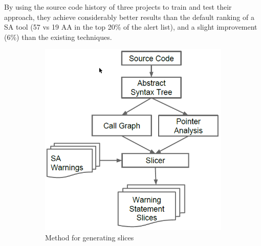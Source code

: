  By using the source code history of three projects to train and test their approach, they achieve considerably better results than the default ranking of a SA tool (57 vs 19 AA in the top 20\% of the alert list), and a slight improvement (6\%) than the existing techniques.

 \begin{figure}[H]
     \begin{subfigure}{.5\textwidth}
         \centering
         \includegraphics[scale=0.3]{./src/alert_patterns_slicing.png}
         \caption{Method for generating slices}\label{alert_patterns:slicing}
     \end{subfigure}%
     \begin{subfigure}{.5\textwidth}
         \centering

\end{subfigure}
\end{figure}

